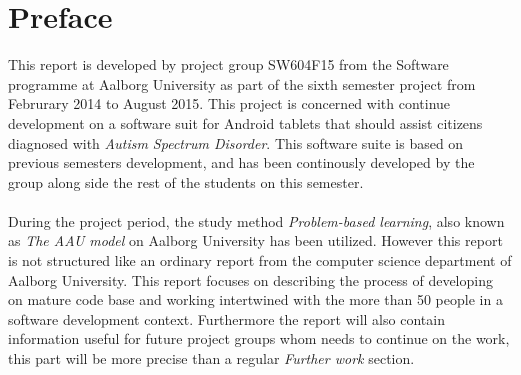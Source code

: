
\chapter*{Preface}

This report is developed by project group SW604F15 from the Software programme at Aalborg University as part of the sixth semester project from Februrary 2014 to August 2015. This project is concerned with continue development on a software suit for Android tablets that should assist citizens diagnosed with \emph{Autism Spectrum Disorder}. This software suite is based on previous semesters development, and has been continously developed by the group along side the rest of the students on this semester.
\\\\
During the project period, the study method \emph{Problem-based learning}, also known as \emph{The AAU model} on Aalborg University has been utilized. However this report is not structured like an ordinary report from the computer science department of Aalborg University. This report focuses on describing the process of developing on mature code base and working intertwined with the more than 50 people in a software development context. Furthermore the report will also contain information useful for future project groups whom needs to continue on the work, this part will be more precise than a regular \emph{Further work} section.

